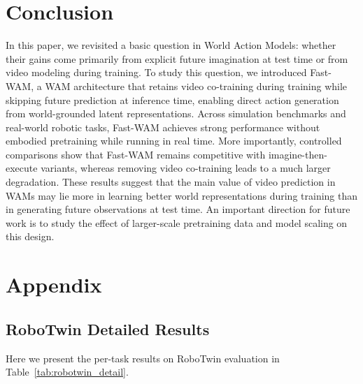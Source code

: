 \documentclass{article}
\begin{document}


\section{Conclusion}

In this paper, we revisited a basic question in World Action Models: whether their gains come primarily from explicit future imagination at test time or from video modeling during training. To study this question, we introduced Fast-WAM, a WAM architecture that retains video co-training during training while skipping future prediction at inference time, enabling direct action generation from world-grounded latent representations.
Across simulation benchmarks and real-world robotic tasks, Fast-WAM achieves strong performance without embodied pretraining while running in real time. More importantly, controlled comparisons show that Fast-WAM remains competitive with imagine-then-execute variants, whereas removing video co-training leads to a much larger degradation. These results suggest that the main value of video prediction in WAMs may lie more in learning better world representations during training than in generating future observations at test time.
An important direction for future work is to study the effect of larger-scale pretraining data and model scaling on this design.


\newpage




\appendix
\section{Appendix}


\subsection{RoboTwin Detailed Results}
Here we present the per-task results on RoboTwin evaluation in Table~\ref{tab:robotwin_detail}.
\end{document}
